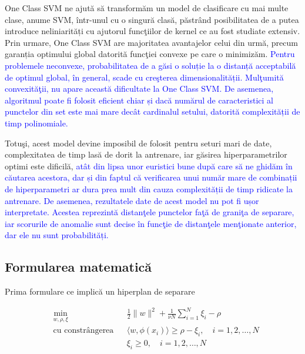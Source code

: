 One Class SVM ne ajută să transformăm un model de clasificare 
cu mai multe clase, anume SVM, într-unul cu o singură clasă,
păstrând posibilitatea de a putea introduce neliniarități 
cu ajutorul funcţiilor de kernel ce au fost studiate extensiv.
Prin urmare, One Class SVM are majoritatea avantajelor celui din urmă, precum
garanția optimului global datorită funcţiei convexe pe care
o minimizăm. \textcolor{blue}{Pentru problemele neconvexe, probabilitatea de 
a găsi o soluție la o distanță acceptabilă de optimul global, în general, 
scade cu creşterea dimensionalității. Mulţumită convexităţii, 
nu apare această dificultate la One Class SVM. De asemenea, 
algoritmul poate fi folosit eficient chiar și dacă 
numărul de caracteristici al punctelor din set este mai
mare decât cardinalul setului, datorită complexității de timp 
polinomiale.}

Totuşi, acest model devine imposibil de folosit pentru 
seturi mari de date, complexitatea de timp lasă de dorit 
la antrenare, iar găsirea hiperparametrilor optimi este 
dificilă, \textcolor{blue}{atât din lipsa unor euristici bune după care 
să ne ghidăm în căutarea acestora, dar și din faptul că verificarea 
unui număr mare de combinații de hiperparametri  
ar dura prea mult din cauza complexității de timp ridicate 
la antrenare. De asemenea, rezultatele date de acest model 
nu pot fi ușor interpretate. Acestea reprezintă distanţele punctelor 
faţă de graniţa de separare, iar scorurile de anomalie sunt decise 
în funcţie de distanţele menţionate anterior, dar ele nu sunt probabilități.
}

\subsection{Formularea matematică}

Prima formulare ce implică un hiperplan de separare

\begin{equation}
    \begin{aligned}
    & \underset{w, \rho, \xi}{\text{min}}
    & & \frac{1}{2} \|w\|^2 + \frac{1}{\nu N} \sum_{i=1}^{N} \xi_i - \rho \\
    & \text{cu constrângerea}
    & & \langle w, \phi(x_i) \rangle \geq \rho - \xi_i, \quad i=1,2,\ldots,N \\
    &&& \xi_i \geq 0, \quad i=1,2,\ldots,N \\
    \end{aligned}
    \end{equation}
    
